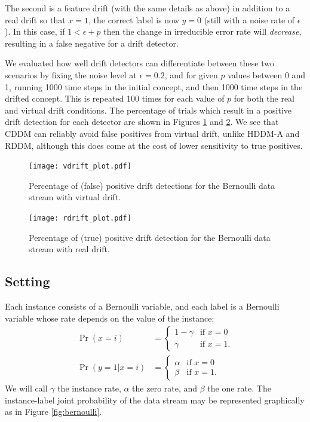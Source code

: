 The second is a feature drift (with the same details as above) in addition to a real drift so that $x=1$, the correct label is now $y=0$ (still with a noise rate of $\epsilon$). In this case, if $1<\epsilon+p$ then the change in irreducible error rate will {\it decrease}, resulting in a false negative for a drift detector. 

We evaluated how well drift detectors can differentiate between these two scenarios by fixing the noise level at $\epsilon=0.2$, and for given $p$ values between 0 and 1, running 1000 time steps in the initial concept, and then 1000 time steps in the drifted concept. This is repeated 100 times for each value of $p$ for both the real and virtual drift conditions. The percentage of trials which result in a positive drift detection for each detector are shown in Figures \ref{fig:vdrift_plot} and \ref{fig:rdrift_plot}. We see that CDDM can reliably avoid false positives from virtual drift, unlike HDDM-A and RDDM, although this does come at the cost of lower sensitivity to true positives. 

\begin{figure}
    \centering
    \texttt{[image: vdrift\_plot.pdf]}
    \caption{Percentage of (false) positive drift detections for the Bernoulli data stream with virtual drift.}
    \label{fig:vdrift_plot}
\end{figure}
\begin{figure}
    \centering
    \texttt{[image: rdrift\_plot.pdf]}
    \caption{Percentage of (true) positive drift detection for the Bernoulli data stream with real drift.}
    \label{fig:rdrift_plot}
\end{figure}

\subsection{Setting}

Each instance consists of a Bernoulli variable, and each label is a Bernoulli variable whose rate depends on the value of the instance:
\begin{align}
  \Pr(x=i) &= \begin{cases}
    1-\gamma & \text{if }x=0 \\
    \gamma & \text{if }x=1.
    \end{cases} \\
  \Pr(y=1|x=i) &= \begin{cases}
    \alpha & \text{if }x=0 \\
    \beta & \text{if }x=1.
    \end{cases}
\end{align}
We will call $\gamma$ the instance rate, $\alpha$ the zero rate, and $\beta$ the one rate. The instance-label joint probability of the data stream may be represented graphically as in Figure \ref{fig:bernoulli}.

